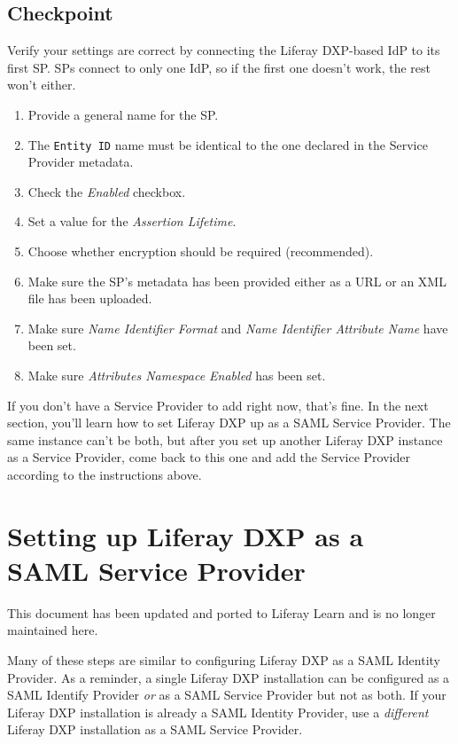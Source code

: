 \section{Checkpoint}\label{checkpoint-1}

Verify your settings are correct by connecting the Liferay DXP-based IdP
to its first SP. SPs connect to only one IdP, so if the first one
doesn't work, the rest won't either.

\begin{enumerate}
\def\labelenumi{\arabic{enumi}.}
\item
  Provide a general name for the SP.
\item
  The \texttt{Entity\ ID} name must be identical to the one declared in
  the Service Provider metadata.
\item
  Check the \emph{Enabled} checkbox.
\item
  Set a value for the \emph{Assertion Lifetime}.
\item
  Choose whether encryption should be required (recommended).
\item
  Make sure the SP's metadata has been provided either as a URL or an
  XML file has been uploaded.
\item
  Make sure \emph{Name Identifier Format} and \emph{Name Identifier
  Attribute Name} have been set.
\item
  Make sure \emph{Attributes Namespace Enabled} has been set.
\end{enumerate}

If you don't have a Service Provider to add right now, that's fine. In
the next section, you'll learn how to set Liferay DXP up as a SAML
Service Provider. The same instance can't be both, but after you set up
another Liferay DXP instance as a Service Provider, come back to this
one and add the Service Provider according to the instructions above.

\chapter{Setting up Liferay DXP as a SAML Service
Provider}\label{setting-up-liferay-dxp-as-a-saml-service-provider}

{This document has been updated and ported to Liferay Learn and is no
longer maintained here.}

Many of these steps are similar to configuring Liferay DXP as a SAML
Identity Provider. As a reminder, a single Liferay DXP installation can
be configured as a SAML Identify Provider \emph{or} as a SAML Service
Provider but not as both. If your Liferay DXP installation is already a
SAML Identity Provider, use a \emph{different} Liferay DXP installation
as a SAML Service Provider.

